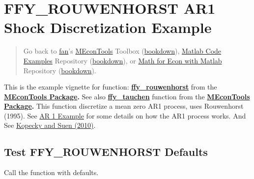 \documentclass[
]{book}
\begin{document}
\hypertarget{ffy_rouwenhorst-ar1-shock-discretization-example}{%
\section{FFY\_ROUWENHORST AR1 Shock Discretization Example}\label{ffy_rouwenhorst-ar1-shock-discretization-example}}

\begin{quote}
Go back to \href{http://fanwangecon.github.io/}{fan}'s \href{https://fanwangecon.github.io/MEconTools/}{MEconTools} Toolbox (\href{https://fanwangecon.github.io/MEconTools/bookdown}{bookdown}), \href{https://fanwangecon.github.io/M4Econ/}{Matlab Code Examples} Repository (\href{https://fanwangecon.github.io/M4Econ/bookdown}{bookdown}), or \href{https://fanwangecon.github.io/Math4Econ/}{Math for Econ with Matlab} Repository (\href{https://fanwangecon.github.io/Math4Econ/bookdown}{bookdown}).
\end{quote}

This is the example vignette for function:
\href{https://github.com/FanWangEcon/MEconTools/blob/master/MEconTools/external/stats/ffy_rouwenhorst.m}{\textbf{ffy\_rouwenhorst}}
from the \href{https://fanwangecon.github.io/MEconTools/}{\textbf{MEconTools
Package}}\textbf{.} See also
\href{https://github.com/FanWangEcon/MEconTools/blob/master/MEconTools/external/stats/ffy_tauchen.m}{\textbf{ffy\_tauchen}}
function from the \href{https://fanwangecon.github.io/MEconTools/}{\textbf{MEconTools
Package}}\textbf{.} This function
discretize a mean zero AR1 process, uses Rouwenhorst (1995). See \href{https://fanwangecon.github.io/M4Econ/panel/timeseries/htmlpdfm/fs_autoregressive.html}{AR 1
Example}
for some details on how the AR1 process works. And See \href{https://doi.org/10.1016/j.red.2010.02.002}{Kopecky and Suen
(2010)}.

\hypertarget{test-ffy_rouwenhorst-defaults}{%
\subsection{Test FFY\_ROUWENHORST Defaults}\label{test-ffy_rouwenhorst-defaults}}

Call the function with defaults.
\end{document}
